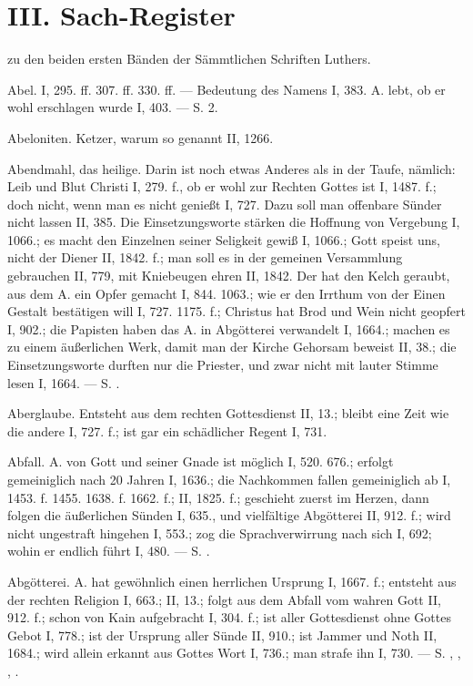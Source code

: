 \chapter{III. Sach-Register}

zu den beiden ersten Bänden der Sämmtlichen Schriften Luthers.

Abel. I, 295. ff. 307. ff. 330. ff. — Bedeutung des Namens I, 383. A. lebt, ob er wohl erschlagen wurde I, 403. — S.  2.

Abeloniten. Ketzer, warum so genannt II, 1266.

Abendmahl, das heilige. Darin ist noch etwas Anderes als in der Taufe, nämlich: Leib und Blut Christi I, 279. f., ob er wohl zur Rechten Gottes ist I, 1487. f.; doch nicht, wenn man es nicht genießt I, 727. Dazu soll man offenbare Sünder nicht lassen II, 385. Die Einsetzungsworte stärken die Hoffnung von Vergebung I, 1066.; es macht den Einzelnen seiner Seligkeit gewiß I, 1066.; Gott speist uns, nicht der Diener II, 1842. f.; man soll es in der gemeinen Versammlung gebrauchen II, 779, mit Kniebeugen ehren II, 1842. Der  hat den Kelch geraubt, aus dem A. ein Opfer gemacht I, 844. 1063.; wie er den Irrthum von der Einen Gestalt bestätigen will I, 727. 1175. f.; Christus hat Brod und Wein nicht geopfert I, 902.; die Papisten haben das A. in Abgötterei verwandelt I, 1664.; machen es zu einem äußerlichen Werk, damit man der Kirche Gehorsam beweist II, 38.; die Einsetzungsworte durften nur die Priester, und zwar nicht mit lauter Stimme lesen I, 1664. — S. .

Aberglaube. Entsteht aus dem rechten Gottesdienst II, 13.; bleibt eine Zeit wie die andere I, 727. f.; ist gar ein schädlicher Regent I, 731.

Abfall. A. von Gott und seiner Gnade ist möglich I, 520. 676.; erfolgt gemeiniglich nach 20 Jahren I, 1636.; die Nachkommen fallen gemeiniglich ab I, 1453. f. 1455. 1638. f. 1662. f.; II, 1825. f.; geschieht zuerst im Herzen, dann folgen die äußerlichen Sünden I, 635., und vielfältige Abgötterei II, 912. f.; wird nicht ungestraft hingehen I, 553.; zog die Sprachverwirrung nach sich I, 692; wohin er endlich führt I, 480. — S. .

Abgötterei. A. hat gewöhnlich einen herrlichen Ursprung I, 1667. f.; entsteht aus der rechten Religion I, 663.; II, 13.; folgt aus dem Abfall vom wahren Gott II, 912. f.; schon von Kain aufgebracht I, 304. f.; ist aller Gottesdienst ohne Gottes Gebot I, 778.; ist der Ursprung aller Sünde II, 910.; ist Jammer und Noth II, 1684.; wird allein erkannt aus Gottes Wort I, 736.; man strafe ihn I, 730. — S. , , , .


